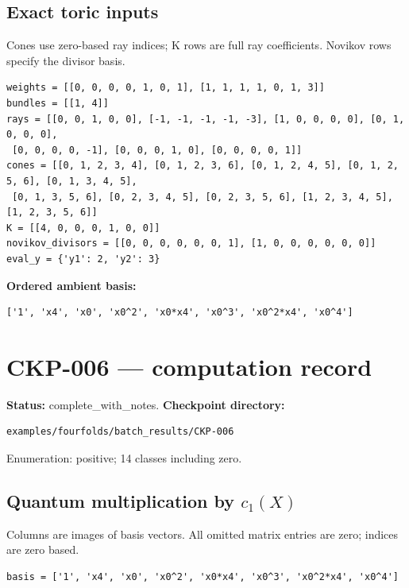 \documentclass[10pt,a4paper]{article}
\begin{document}
\subsection*{Exact toric inputs}
Cones use zero-based ray indices; K rows are full ray coefficients. Novikov rows specify the divisor basis.

\begin{lstlisting}
weights = [[0, 0, 0, 0, 1, 0, 1], [1, 1, 1, 1, 0, 1, 3]]
bundles = [[1, 4]]
rays = [[0, 0, 1, 0, 0], [-1, -1, -1, -1, -3], [1, 0, 0, 0, 0], [0, 1, 0, 0, 0],
 [0, 0, 0, 0, -1], [0, 0, 0, 1, 0], [0, 0, 0, 0, 1]]
cones = [[0, 1, 2, 3, 4], [0, 1, 2, 3, 6], [0, 1, 2, 4, 5], [0, 1, 2, 5, 6], [0, 1, 3, 4, 5],
 [0, 1, 3, 5, 6], [0, 2, 3, 4, 5], [0, 2, 3, 5, 6], [1, 2, 3, 4, 5], [1, 2, 3, 5, 6]]
K = [[4, 0, 0, 0, 1, 0, 0]]
novikov_divisors = [[0, 0, 0, 0, 0, 0, 1], [1, 0, 0, 0, 0, 0, 0]]
eval_y = {'y1': 2, 'y2': 3}
\end{lstlisting}

\textbf{Ordered ambient basis:}
\begin{lstlisting}
['1', 'x4', 'x0', 'x0^2', 'x0*x4', 'x0^3', 'x0^2*x4', 'x0^4']
\end{lstlisting}

\clearpage\section*{CKP-006 --- computation record}
\textbf{Status:} complete\_with\_notes.
\textbf{Checkpoint directory:}
\begin{lstlisting}
examples/fourfolds/batch_results/CKP-006
\end{lstlisting}

Enumeration: positive; 14 classes including zero.
\subsection*{Quantum multiplication by $c_1(X)$}
Columns are images of basis vectors. All omitted matrix entries are zero; indices are zero based.

\begin{lstlisting}
basis = ['1', 'x4', 'x0', 'x0^2', 'x0*x4', 'x0^3', 'x0^2*x4', 'x0^4']
\end{lstlisting}
\end{document}
